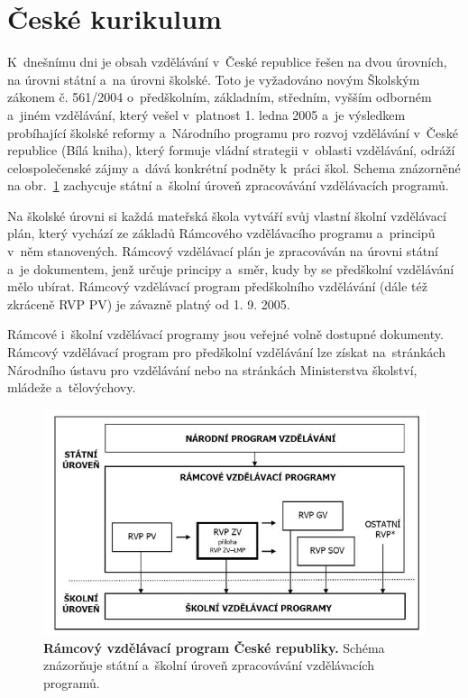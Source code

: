 	\section{České kurikulum}

		K dnešnímu dni je obsah vzdělávání v České republice řešen na dvou úrovních, na úrovni státní a~na úrovni školské. Toto je vyžadováno novým Školským zákonem č. 561/2004 o~předškolním, základním, středním, vyšším odborném a~jiném vzdělávání, který vešel v platnost 1. ledna 2005 a~je výsledkem probíhající školské reformy a~Národního programu pro rozvoj vzdělávání v České republice (Bílá kniha), který formuje vládní strategii v oblasti vzdělávání, odráží celospolečenské zájmy a~dává konkrétní podněty k práci škol. Schema znázorněné na obr.~\ref{obr:rvpCR} zachycuje státní a~školní úroveň zpracovávání vzdělávacích programů.

		Na školské úrovni si každá mateřská škola vytváří svůj vlastní školní vzdělávací plán, který vychází ze základů Rámcového vzdělávacího programu a~principů v něm stanovených. Rámcový vzdělávací plán je zpracováván na úrovni státní a~je dokumentem, jenž určuje principy a~směr, kudy by se předškolní vzdělávání mělo ubírat. Rámcový vzdělávací program předškolního vzdělávání (dále též zkráceně RVP PV) je závazně platný od 1. 9. 2005.

		Rámcové i~školní vzdělávací programy jsou veřejné volně dostupné dokumenty. Rámcový vzdělávací program pro předškolní vzdělávání lze získat na stránkách Národního ústavu pro vzdělávání \citep{RVP} nebo na stránkách Ministerstva školství, mládeže a~tělovýchovy.

		
		\begin{figure}[h]
			\vspace{15mm}
			\center
			\includegraphics[width=0.8\linewidth]{fotky/rvpCR.jpg}
			\caption{
				\textbf{Rámcový vzdělávací program České republiky.}
				Schéma znázorňuje státní a~školní úroveň zpracovávání vzdělávacích programů.
			}
			\label{obr:rvpCR}
		\end{figure}

